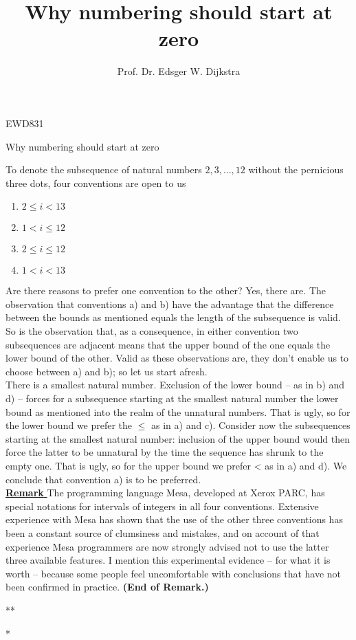 \documentclass[]{article}
\title{Why numbering should start at zero}
\author{Prof. Dr. Edsger W. Dijkstra}
\date{}
\begin{document}
\maketitle


\begin{flushright}
	EWD831
\end{flushright}

Why numbering should start at zero

To denote the subsequence of natural numbers $2, 3, ... ,12$ without the pernicious three dots, four conventions are open to us

\noindent 

\begin{enumerate}[label=\alph*]
\item $2 \leq i < 13$
\item $1 < i \leq 12$
\item $2 \leq i \leq 12$
\item $1 < i < 13$
\end{enumerate}


Are there reasons to prefer one convention to the other? Yes, there are. The observation that conventions a) and b) have the advantage that the difference between the bounds as mentioned equals the length of the subsequence is valid. So is the observation that, as a consequence, in either convention two subsequences are adjacent means that the upper bound of the one equals the lower bound of the other. Valid as these observations are, they don't enable us to choose between a) and b); so let us start afresh.\\

There is a smallest natural number. Exclusion of the lower bound -- as in b) and d) -- forces for a subsequence starting at the smallest natural number the lower bound as mentioned into the realm of the unnatural numbers. That is ugly, so for the lower bound we prefer the $\leq$ as in a) and c). Consider now the subsequences starting at the smallest natural number: inclusion of the upper bound would then force the latter to be unnatural by the time the sequence has shrunk to the empty one. That is ugly, so for the upper bound we prefer < as in a) and d). We conclude that convention a) is to be preferred.\\

\underline{\textbf{Remark} } The programming language Mesa, developed at Xerox PARC, has special notations for intervals of integers in all four conventions. Extensive experience with Mesa has shown that the use of the other three conventions has been a constant source of clumsiness and mistakes, and on account of that experience Mesa programmers are now strongly advised not to use the latter three available features. I mention this experimental evidence -- for what it is worth -- because some people feel uncomfortable with conclusions that have not been confirmed in practice.\textbf{ (End of Remark.)}\\
\begin{center} {\centering
*\hspace*{3.5cm}*\par
*
}
\end{center}
\end{document}
